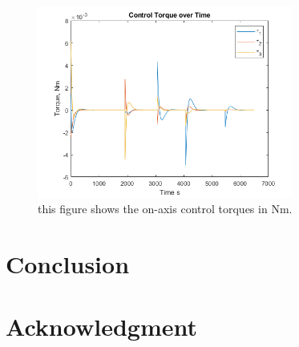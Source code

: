 \documentclass[paper]{aiaaNew}
\begin{document}
 \begin{figure}[!htbp] 
  \centering
  \includegraphics[width=0.75\textwidth]{Figures/T11_control.png}
  \caption{this figure shows the on-axis control torques in Nm.}
  \label{fig:T11_control}
 \end{figure}








\section{Conclusion}



\section*{Acknowledgment}





\newpage


\newpage





\end{document}
